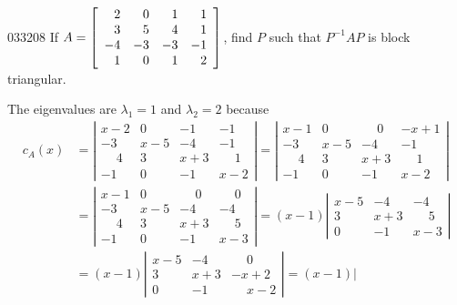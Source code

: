 \begin{example}{}{033208}
If $A = \left[ \begin{array}{rrrr}
2 & 0 & 1 & 1 \\
3 & 5 & 4 & 1 \\
-4 & -3 & -3 & -1 \\
1 & 0 & 1 & 2
\end{array} \right]$, find $P$ such that $P^{-1}AP$ is block triangular.


\begin{solution}
  The eigenvalues are $\lambda_{1} = 1$ and $\lambda_{2} = 2$ because
\begin{align*}
c_A(x) &= \left| \begin{array}{cccc}
x - 2 & 0 & -1 & -1 \\
-3 & x - 5 & -4 & -1 \\
\mathbin{\phantom{-}}4 & 3 & x + 3 & \mathbin{\phantom{-}}1 \\
-1 & 0 & -1 & x - 2
\end{array} \right| = \left| \begin{array}{cccc}
x - 1 & 0 & \mathbin{\phantom{-}}0 & -x + 1 \\
-3 & x - 5 & -4 & -1 \\
\mathbin{\phantom{-}}4 & 3 & x + 3 & \mathbin{\phantom{-}}1 \\
-1 & 0 & -1 & x - 2
\end{array} \right| \\
&= \left| \begin{array}{cccc}
x - 1 & 0 & \mathbin{\phantom{-}}0 & \mathbin{\phantom{-}}0 \\
-3 & x - 5 & -4 & -4 \\
\mathbin{\phantom{-}}4 & 3 & x + 3 & \mathbin{\phantom{-}}5 \\
-1 & 0 & -1 & x - 3
\end{array} \right| = (x - 1) \left| \begin{array}{ccc}
x - 5 & -4 & -4 \\
3 & x + 3 & \mathbin{\phantom{-}}5 \\
0 & -1 & x - 3
\end{array} \right| \\
&= (x - 1) \left| \begin{array}{ccc}
x - 5 & -4 & \mathbin{\phantom{-}}0 \\
3 & x + 3 & -x + 2 \\
0 & -1 & \mathbin{\phantom{-}}x - 2
\end{array} \right| = (x - 1) \left| \begin{array}{ccc}

\end{array}
\end{align*}
\end{solution}
\end{example}
